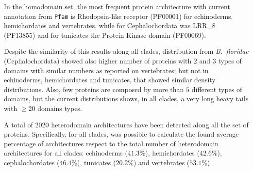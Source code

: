 \documentclass[11pt]{article}
\newcommand{\TODO}[1]{\begingroup\color{red}#1\endgroup}
\begin{document}
In the homodomain set, the most frequent protein architecture with 
current annotation from \texttt{Pfam} is Rhodopsin-like receptor 
(PF00001) for echinoderms, hemichordates and vertebrates, while for 
Cephalochordata was LRR\_8 (PF13855) and for tunicates the Protein 
Kinase domain (PF00069). 

 


Despite the similarity of this results along all clades, distribution 
from \textsl{B.\ floridae} (Cephalochordata) showed also higher number of 
proteins with $2$ and $3$ types of domains with similar numbers as reported 
on vertebrates; but not in echinoderms, hemichordates and tunicates, that 
showed similar density distributions. Also, few proteins are composed by more 
than $5$ different types of domains, but the current distributions shows, in 
all clades, a very long heavy tails with \TODO{$\ge 20$ domains types}.



A total of $2020$ heterodomain architectures have been detected along all
the set of proteins. Specifically, for all clades, was possible to calculate 
the found average percentage of architectures respect to the total number of 
heterodomain architectures for all clades: echinoderms ($41.3$\%), 
hemichordates ($42.6$\%), cephalochordates ($46.4$\%), tunicates 
($20.2$\%) and vertebrates ($53.1$\%). 
\end{document}

